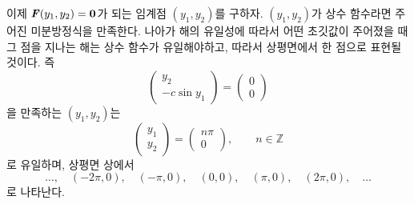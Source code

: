 \documentclass[../engineering_mathematics_lecture_note.tex]{subfiles}
\begin{document}
\begin{example}
    이제 $\bm{\mathit{F}}(y_1, y_2) = \bm{\mathrm{0}}$가 되는 임계점 $(y_1, y_2)$를 구하자.
    $(y_1, y_2)$가 상수 함수라면 주어진 미분방정식을 만족한다.
    나아가 해의 유일성에 따라서 어떤 초깃값이 주어졌을 때 그 점을 지나는 해는 상수 함수가 유일해야하고, 따라서 상평면에서 한 점으로 표현될 것이다.
    즉
    \begin{equation*}
        \begin{pmatrix}
            y_2 \\ -c \sin y_1
        \end{pmatrix} = \begin{pmatrix}
            0 \\ 0
        \end{pmatrix}
    \end{equation*}
    을 만족하는 $(y_1, y_2)$는
    \begin{equation*}
        \begin{pmatrix}
            y_1 \\ y_2
        \end{pmatrix} = \begin{pmatrix}
            n\pi \\ 0
        \end{pmatrix}, \qquad n \in \mathbb Z
    \end{equation*}
    로 유일하며, 상평면 상에서
    \begin{equation*}
        \dots, \quad  (-2\pi, 0), \quad (-\pi, 0),\quad (0, 0),\quad (\pi, 0),\quad (2\pi, 0),\quad \dots
    \end{equation*}
    로 나타난다.
    

\end{example}
\end{document}
